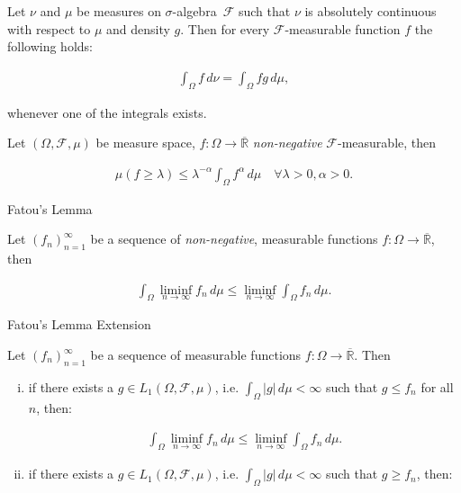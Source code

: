 \documentclass[10pt,landscape]{article}
\renewcommand{\leq}{\leqslant}
\renewcommand{\geq}{\geqslant}
\newcommand{\SigmaAlgebra}{$\sigma$-algebra}
\newcommand{\CalF}{\mathcal{F}}
\begin{document}
\begin{multicols}{3}
\begin{proposition}{3.16}{}
    Let $\nu$ and $\mu$ be measures on \SigmaAlgebra\ $\CalF$ such that $\nu$ is absolutely continuous with respect to $\mu$ and density $g$. Then for every $\CalF$-measurable function $f$ the following holds:

        \begin{align*}
            \int_{\Omega} f \, d\nu = \int_{\Omega} fg \, d\mu,
        \end{align*}

    whenever one of the integrals exists.

\end{proposition}

\begin{remark}{3.3}{}

    Let $(\Omega, \mathcal{F}, \mu)$ be measure space, $f: \Omega \to \overline{\mathbb{R}}$ \emph{non-negative} $\mathcal{F}$-measurable, then

        \begin{align*}
            \mu(f \geq \lambda) \leq \lambda^{-\alpha} \int_{\Omega} f^{\alpha} \,d\mu \quad \forall \lambda > 0, \alpha > 0.
        \end{align*}

\end{remark}

\begin{lemma}{3.10}{Fatou's Lemma}

    Let $(f_n)_{n=1}^{\infty}$ be a sequence of \emph{non-negative}, measurable functions $f: \Omega \to \overline{\mathbb{R}}$, then

        \begin{align*}
            \int_{\Omega} \liminf_{n \to \infty} f_n \, d\mu \leq \liminf_{n \to \infty} \int_{\Omega} f_n \, d\mu.
        \end{align*}

\end{lemma}

\begin{corollary}{3.11}{Fatou's Lemma Extension}

    Let $(f_n)_{n=1}^{\infty}$ be a sequence of measurable functions $f: \Omega \to \overline{\mathbb{R}}$. Then

        \begin{enumerate}[(i)]
            \item if there exists a $g \in L_1(\Omega, \CalF, \mu)$, i.e. $\int_{\Omega} |g| \, d\mu < \infty$ such that $g \leq f_n$ for all $n$, then:

            \begin{align*}
                \int_{\Omega} \liminf_{n \to \infty} f_n \, d\mu \leq \liminf_{n \to \infty} \int_{\Omega} f_n \, d\mu.
            \end{align*}
            \item if there exists a $g \in L_1(\Omega, \CalF, \mu)$, i.e. $\int_{\Omega} |g| \, d\mu < \infty$ such that $g \geq f_n$, then:


\end{enumerate}
\end{corollary}
\end{multicols}
\end{document}
